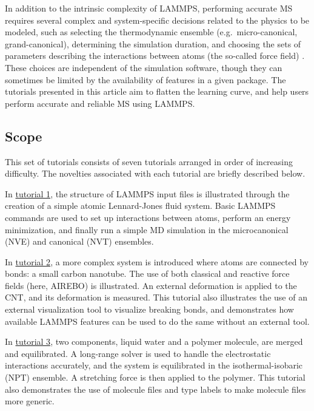 \documentclass[9pt,tutorial]{livecoms}
\begin{document}
In addition to the intrinsic complexity of LAMMPS, performing accurate
MS requires several complex and system-specific decisions related
to the physics to be modeled, such as selecting the thermodynamic
ensemble (e.g.~micro-canonical, grand-canonical), determining the
simulation duration, and choosing the sets of parameters describing the
interactions between atoms (the so-called force field)
\cite{van2018validation}.  These choices are independent of the
simulation software, though they can sometimes be limited by the availability of
features in a given package.  The tutorials presented in this
article aim to flatten the learning curve, and help users perform
accurate and reliable MS using LAMMPS.

\subsection{Scope}

This set of tutorials consists of seven tutorials arranged in order of
increasing difficulty.  The novelties associated with each tutorial are
briefly described below.

In \hyperref[lennard-jones-label]{tutorial 1}, the structure of LAMMPS
input files is illustrated through the creation of a simple atomic
Lennard-Jones fluid system.  Basic LAMMPS commands are used to set up
interactions between atoms, perform an energy minimization, and finally
run a simple MD simulation in the microcanonical (NVE) and canonical (NVT)
ensembles.

In \hyperref[carbon-nanotube-label]{tutorial 2}, a more complex system
is introduced where atoms are connected by bonds: a small carbon
nanotube.  The use of both classical and reactive force fields (here,
AIREBO) is illustrated.  An external deformation is applied to the CNT,
and its deformation is measured.  This tutorial also illustrates the use
of an external visualization tool to visualize breaking bonds, and
demonstrates how available LAMMPS features can be used to do the same
without an external tool.

In \hyperref[all-atoms-label]{tutorial 3}, two components, liquid water
and a polymer molecule, are merged and equilibrated.  A long-range
solver is used to handle the electrostatic interactions accurately, and
the system is equilibrated in the isothermal-isobaric (NPT) ensemble.  A
stretching force is then applied to the polymer.  This tutorial also
demonstrates the use of molecule files and type labels
\cite{typelabel_paper} to make molecule files more generic.
\end{document}
